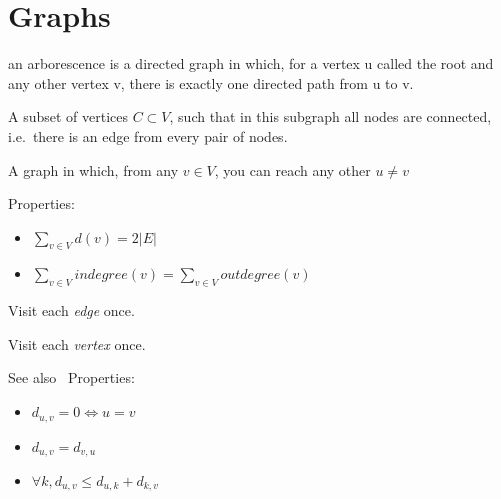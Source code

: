 \section{Graphs}

\begin{definition}[Arborescence]
    an arborescence is a directed graph in which, for a vertex u called the
    root and any other vertex v, there is exactly one directed path from u to v.
 \end{definition}

\begin{definition}[Clique]
    A subset of vertices $C \subset V$, such that in this subgraph all nodes
    are connected, i.e.\ there is an edge from every pair of nodes.
\end{definition}

\begin{definition}\label{connectedcomp}
    A graph in which, from any $v \in V$, you can reach any other $u \neq v$
\end{definition}

\begin{definition}
    Properties:
    \begin{itemize}
        \item $\sum\limits_{v \in V}{d(v)} = 2|E|$
        \item $\sum\limits_{v \in V}{indegree(v)} = 
            \sum\limits_{v \in V}{outdegree(v)}$
    \end{itemize}
\end{definition}

\begin{definition}[Eularian]\label{eularian}
    Visit each \textit{edge} once.
\end{definition}

\begin{definition}[Hamiltonian]
    Visit each \textit{vertex} once.
\end{definition}

\begin{definition}\label{metric}
    See also~
    Properties:
    \begin{itemize}
        \item $d_{u,v} = 0 \iff u = v$
        \item $d_{u,v} = d_{v,u}$
        \item $\forall k, d_{u,v} \leq d_{u,k} + d_{k,v}$
    \end{itemize}
\end{definition}


